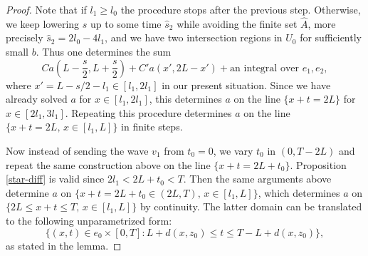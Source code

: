 \documentclass[10pt,a4paper]{amsart}
\begin{document}
\begin{proof}
Note that if $l_1\geq l_0$ the procedure stops after the previous step. Otherwise,
we keep lowering $s$ up to some time $\hat{s}_2$ while avoiding the finite set $\hat{A}$, more precisely $\hat{s}_2=2l_0-4l_1$, and we have two intersection regions in $U_0$ for sufficiently small $b$. Thus one determines the sum
$$C  a(L-\frac{s}{2},L+\frac{s}{2}) + C'  a(x',2L-x') + \textrm{an integral over }e_1,e_2,$$
where $x'=L-s/2-l_1\in [l_1,2l_1]$ in our present situation. Since we have already solved $a$ for $x\in [l_1,2l_1]$, this determines $a$ on the line $\{x+t=2L\}$ for $x\in [2l_1,3l_1]$.
{Repeating this procedure determines $a$ on the line $\{x+t=2L,\, x\in [l_1,L]\}$ in finite steps.}

Now instead of sending the wave $v_1$ from $t_0=0$, we vary $t_0$ in $(0,T-2L)$ and repeat the same construction above on the line $\{x+t=2L+t_0\}$. 
Proposition \ref{star-diff} is valid since $2l_1 < 2L+t_0< T$.
Then the same arguments above determine $a$ on 
$\big\{x+t=2L+t_0\in (2L,T), \, x\in [l_1,L] \big\}$, which determines $a$ on $\big\{2L \leq x+t \leq T, \, x\in [l_1,L] \big\}$ by continuity.
The latter domain can be translated to the following unparametrized form:
$$\big\{(x,t)\in e_0\times [0,T]: 
L+d(x,z_0) \leq t \leq T-L+d(x,z_0) \big\},$$
as stated in the lemma.
\end{proof}
\end{document}
